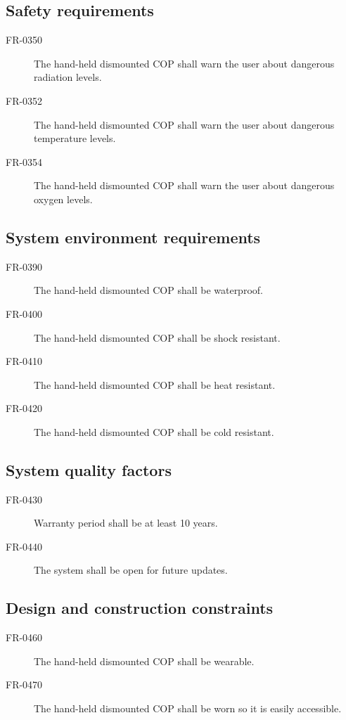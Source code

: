 \subsection{Safety requirements }
\begin{description}
\item[FR-0350] The hand-held dismounted COP shall warn the user about dangerous radiation
levels.
\item[ FR-0352] The hand-held dismounted COP shall warn the user about dangerous
temperature levels.
\item[FR-0354] The hand-held dismounted COP shall warn the user about dangerous oxygen
levels.
\end{description}
 
 
\subsection{System environment requirements}
\begin{description}
\item[FR-0390] The hand-held dismounted COP shall be waterproof.
\item[FR-0400] The hand-held dismounted COP shall be shock resistant.
\item[FR-0410] The hand-held dismounted COP shall be heat resistant.
\item[FR-0420] The hand-held dismounted COP shall be cold resistant.
\end{description}

\subsection{System quality factors}
\begin{description}
\item[FR-0430] Warranty period shall be at least 10 years.
\item[FR-0440] The system shall be open for future updates.
\end{description}

\subsection{Design and construction constraints}
\begin{description}
\item[FR-0460] The hand-held dismounted COP shall be wearable. 
\item[FR-0470] The hand-held dismounted COP shall be worn so it is easily accessible.
\end{description}

